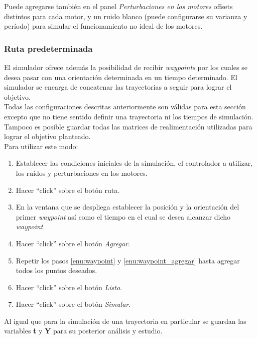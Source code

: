 \documentclass[main]{subfiles}
\begin{document}
Puede agregarse tambi\'en en el panel \emph{Perturbaciones en los motores} offsets distintos para cada motor, y un ruido blanco (puede configurarse su varianza y per\'iodo) para simular el funcionamiento no ideal de los motores.\\

\subsubsection*{Ruta predeterminada}
El simulador ofrece adem\'as la posibilidad de recibir \emph{waypoints} por los cuales se desea pasar con una orientaci\'on determinada en un tiempo determinado. El simulador se encarga de concatenar las trayectorias a seguir para lograr el objetivo.\\

Todas las configuraciones descritas anteriormente son v\'alidas para esta secci\'on excepto que no tiene sentido definir una trayectoria ni los tiempos de simulaci\'on. Tampoco es posible guardar todas las matrices de realimentaci\'on utilizadas para lograr el objetivo planteado.\\

Para utilizar este modo:
\begin{enumerate}
\item Establecer las condiciones iniciales de la simulaci\'on, el controlador a utilizar, los ruidos y perturbaciones en los motores.
\item Hacer ``click'' sobre el bot\'on ruta. 
\item\label{enu:waypoint} En la ventana que se despliega establecer la posici\'on y la orientaci\'on del primer \emph{waypoint} as\'i como el tiempo en el cual se desea alcanzar dicho \emph{waypoint}.
\item\label{enu:waypoint_agregar} Hacer ``click'' sobre el bot\'on \emph{Agregar}.
\item Repetir los pasos \ref{enu:waypoint} y \ref{enu:waypoint_agregar} hasta agregar todos los puntos deseados.
\item Hacer ``click'' sobre el bot\'on \emph{Listo}.
\item Hacer ``click'' sobre el bot\'on \emph{Simular}.
\end{enumerate}

Al igual que para la simulaci\'on de una trayectoria en particular se guardan las variables \textbf{t} y \textbf{Y} para su posterior an\'alisis y estudio.
\end{document}
